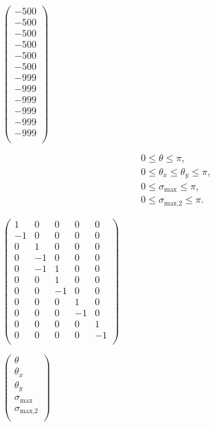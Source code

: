 \documentclass[a4paper,11pt,twoside,openright]{book}
\def\lthtmlcheckvsize{\ifdim\ht\sizebox<\vsize 
  \ifdim\wd\sizebox<\hsize\expandafter\hfill\fi \expandafter\vfill
  \else\expandafter\vss\fi}%
\begin{document}
{\newpage\clearpage
{}%
$\displaystyle \begin{pmatrix}
-500 \\
-500 \\
-500 \\
-500 \\
-500 \\
-500 \\
-999 \\
-999 \\
-999 \\
-999 \\
-999 \\
-999 \\
\end{pmatrix}$%
\lthtmlindisplaymathZ
\lthtmlcheckvsize\clearpage}

{\newpage\clearpage
\setcounter{equation}{80}
%
\begin{subequations}\begin{gather}
0 \leqslant \theta \leqslant \pi, \\
0 \leqslant \theta_x \leqslant \theta_y \leqslant \pi, \\
0 \leqslant \sigma_{\textrm{max}}\leqslant \pi, \\
0 \leqslant \sigma_{\textrm{max,2}}\leqslant \pi.
\end{gather}\end{subequations}%
\lthtmldisplayZ
\lthtmlcheckvsize\clearpage}

{\newpage\clearpage
{}%
$\displaystyle \begin{pmatrix}
1 & 0 & 0 & 0 & 0 \\
-1& 0 & 0 & 0 & 0 \\
0 & 1 & 0 & 0 & 0 \\
0 &-1 & 0 & 0 & 0 \\
0 &-1 & 1 & 0 & 0 \\
0 & 0 & 1 & 0 & 0 \\
0 & 0 &-1 & 0 & 0 \\
0 & 0 & 0 & 1 & 0 \\
0 & 0 & 0 &-1 & 0 \\
0 & 0 & 0 & 0 & 1 \\
0 & 0 & 0 & 0 &-1 \\
\end{pmatrix}$%
\lthtmlindisplaymathZ
\lthtmlcheckvsize\clearpage}

{\newpage\clearpage
{}%
$\displaystyle \begin{pmatrix}
\theta \\
\theta_x \\
\theta_y \\
\sigma_{\textrm{max}}\\
\sigma_{\textrm{max,2}}\\
\end{pmatrix}$%
\lthtmlindisplaymathZ
\lthtmlcheckvsize\clearpage}
\end{document}
